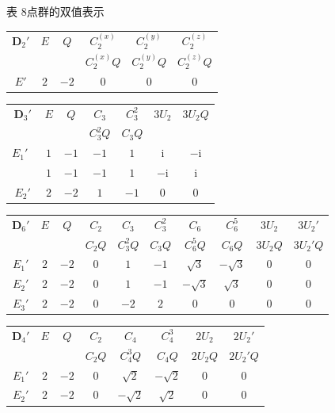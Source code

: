 \begin{center}
{\heiti 表 8}\quad 点群的双值表示
\end{center}

\begin{center}
\renewcommand{\arraystretch}{1.3}%
\begin{tabular}{c|cc|ccc}
  $\boldsymbol{D}_2'$ & $E$ & $Q$
  & $C_2^{(x)}$ & $C_2^{(y)}$ & $C_2^{(z)}$\\
  & & & $C_2^{(x)}Q$ & $C_2^{(y)}Q$ & $C_2^{(z)}Q$\\
  \hline
  $E'$ & $2$ & $-2$ & $0$ & $0$ & $0$\\
\end{tabular}

\vspace{1.2em}

\begin{tabular}{c|cc|cc|cc}
  $\boldsymbol{D}_3'$ & $E$ & $Q$
  & $C_3$ & $C_3^2$ & $3U_2$ & $3U_2Q$\\
  & & & $C_3^2Q$ & $C_3Q$ & & \\
  \hline
  $E_1'$\ \smash{\raisebox{0.45em}{$\Bigg\}$}}
  & $1$ & $-1$ & $-1$ & $1$ & $\mathrm{i}$ & $-\mathrm{i}$\\
  & $1$ & $-1$ & $-1$ & $1$ & $-\mathrm{i}$ & $\mathrm{i}$\\
  $E_2'$ & $2$ & $-2$ & $1$ & $-1$ & $0$ & $0$\\
\end{tabular}

\vspace{1.2em}

\begin{tabular}{c|cc|ccccccc}
  $\boldsymbol{D}_6'$ & $E$ & $Q$
  & $C_2$ & $C_3$ & $C_3^2$ & $C_6$ & $C_6^5$ & $3U_2$ & $3U_2'$\\
  & & & $C_2Q$ & $C_3^2Q$ & $C_3Q$ & $C_6^5Q$ & $C_6Q$ & $3U_2Q$ & $3U_2'Q$\\
  \hline
  $E_1'$ & $2$ & $-2$ & $0$ & $1$ & $-1$ & $\sqrt{3}$ & $-\sqrt{3}$ & $0$ & $0$\\
  $E_2'$ & $2$ & $-2$ & $0$ & $1$ & $-1$ & $-\sqrt{3}$ & $\sqrt{3}$ & $0$ & $0$\\
  $E_3'$ & $2$ & $-2$ & $0$ & $-2$ & $2$ & $0$ & $0$ & $0$ & $0$\\
\end{tabular}

\vspace{1.2em}

\begin{tabular}{c|cc|ccccc}
  $\boldsymbol{D}_4'$ & $E$ & $Q$
  & $C_2$ & $C_4$ & $C_4^3$ & $2U_2$ & $2U_2'$\\
  & & & $C_2Q$ & $C_4^3Q$ & $C_4Q$ & $2U_2Q$ & $2U_2'Q$\\
  \hline
  $E_1'$ & $2$ & $-2$ & $0$ & $\sqrt{2}$ & $-\sqrt{2}$ & $0$ & $0$\\
  $E_2'$ & $2$ & $-2$ & $0$ & $-\sqrt{2}$ & $\sqrt{2}$ & $0$ & $0$\\
\end{tabular}


\end{center}
